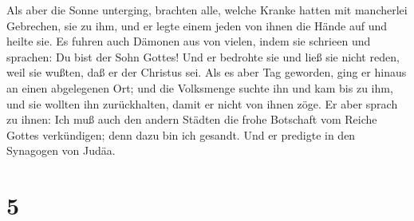  Als aber die Sonne unterging, brachten alle, welche
Kranke hatten mit mancherlei Gebrechen, sie zu ihm, und er legte einem
jeden von ihnen die Hände auf und heilte sie.  Es fuhren
auch Dämonen aus von vielen, indem sie schrieen und sprachen: Du bist
der Sohn Gottes! Und er bedrohte sie und ließ sie nicht reden, weil sie
wußten, daß er der Christus sei.  Als es aber Tag
geworden, ging er hinaus an einen abgelegenen Ort; und die Volksmenge
suchte ihn und kam bis zu ihm, und sie wollten ihn zurückhalten, damit
er nicht von ihnen zöge.  Er aber sprach zu ihnen: Ich
muß auch den andern Städten die frohe Botschaft vom Reiche Gottes
verkündigen; denn dazu bin ich gesandt.  Und er predigte
in den Synagogen von Judäa.

\hypertarget{section-4}{%
\section{5}\label{section-4}}

